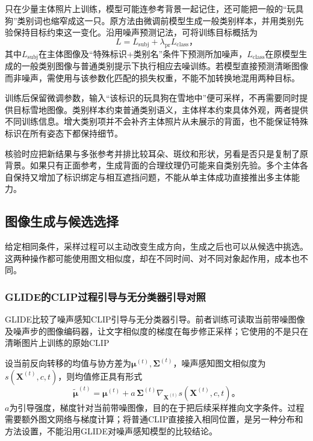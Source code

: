 只在少量主体照片上训练，模型可能连参考背景一起记住，还可能把一般的“玩具狗”类别词也缩窄成这一只。原方法由微调前模型生成一般类别样本，并用类别先验保持目标约束这一变化。沿用噪声预测记法，可将训练目标概括为
\begin{equation}
 L=L_{\mathrm{subj}}+\lambda_{\mathrm{pr}}L_{\mathrm{class}}\text{，}
 \label{eq:vision-dreambooth}
\end{equation}
其中$L_{\mathrm{subj}}$在主体图像及“特殊标识+类别名”条件下预测所加噪声，$L_{\mathrm{class}}$在原模型生成的一般类别图像与普通类别提示下执行相应去噪训练。若模型直接预测清晰图像而非噪声，需使用与该参数化匹配的损失权重，不能不加转换地混用两种目标。

训练后保留微调参数，输入“该标识的玩具狗在雪地中”便可采样，不再需要同时提供目标雪地图像。类别样本约束普通类别语义，主体样本约束具体外观，两者提供不同训练信息。增大类别项并不会补齐主体照片从未展示的背面，也不能保证特殊标识在所有姿态下都保持细节。

核验时应把新结果与多张参考并排比较耳朵、斑纹和形状，另看是否只是复制了原背景。如果只有正面参考，生成背面的合理纹理仍可能来自类别先验。多个主体各自保持又增加了标识绑定与相互遮挡问题，不能从单主体成功直接推出多主体能力。

\subsection{图像生成与候选选择}
\label{sec:vision-generation-selection}

给定相同条件，采样过程可以主动改变生成方向，生成之后也可以从候选中挑选。这两种操作都可能使用图文相似度，却在不同时间、对不同对象起作用，成本也不同。

\Needspace{60mm}
\subsubsection{GLIDE的CLIP过程引导与无分类器引导对照}
\label{sec:vision-generation-glide-guidance}

GLIDE比较了噪声感知CLIP引导与无分类器引导。前者训练可读取当前带噪图像及噪声步的图像编码器，让文字相似度的梯度在每步修正采样；它使用的不是只在清晰图片上训练的原始CLIP

设当前反向转移的均值与协方差为$\bm{\mu}^{(t)},\bm{\Sigma}^{(t)}$，噪声感知图文相似度为$s(\bm{X}^{(t)},c,t)$，则均值修正具有形式
\begin{equation}
 \tilde{\bm{\mu}}^{(t)}
 =\bm{\mu}^{(t)}
  +a\,\bm{\Sigma}^{(t)}
   \nabla_{\bm{X}^{(t)}}s(\bm{X}^{(t)},c,t)\text{。}
 \label{eq:vision-clip-process-guidance}
\end{equation}
$a$为引导强度，梯度针对当前带噪图像，目的在于把后续采样推向文字条件。过程需要额外图文网络与梯度计算；将普通CLIP直接接入相同位置，是另一种分布和方法设置，不能沿用GLIDE对噪声感知模型的比较结论。

